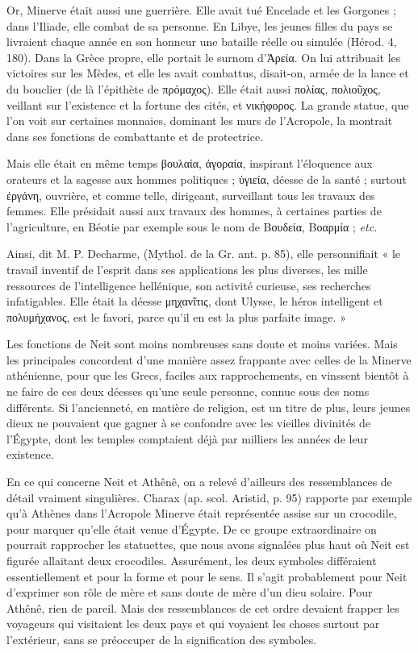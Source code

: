 \documentclass[a4paper, 11pt, oneside]{article}
\begin{document}
Or, Minerve était aussi une guerrière. Elle avait tué Encelade et les Gorgones ; dans l'Iliade, elle combat de sa personne. En Libye, les jeunes filles du pays se livraient chaque année en son honneur une bataille réelle ou simulée (Hérod. 4, 180). Dans la Grèce propre, elle portait le surnom d'Ἀρεία. On lui attribuait les victoires sur les Mèdes, et elle les avait combattus, disait-on, armée de la lance et du bouclier (de là l'épithète de πρόμαχος). Elle était aussi πολίας, πολιοῦχος, veillant sur l'existence et la fortune des cités, et νικήφορος. La grande statue, que l'on voit sur certaines monnaies, dominant les murs de l'Acropole, la montrait dans ses fonctions de combattante et de protectrice.

Mais elle était en même temps βουλαία, ἀγοραία, inspirant l'éloquence aux orateurs et la sagesse aux hommes politiques ; ὑγιεία, déesse de la santé ; surtout ἐργάνη, ouvrière, et comme telle, dirigeant, surveillant tous les travaux des femmes. Elle présidait aussi aux travaux des hommes, à certaines parties de l'agriculture, en Béotie par exemple sous le nom de Βουδεία, Βοαρμία ; \emph{etc.}

Ainsi, dit M. P. Decharme, (Mythol. de la Gr. ant. p. 85), elle personnifiait « le travail inventif de l'esprit dans ses applications les plus diverses, les mille ressources de l'intelligence hellénique, son activité curieuse, ses recherches infatigables. Elle était la déesse μηχανῖτις, dont Ulysse, le héros intelligent et πολυμήχανος, est le favori, parce qu’il en est la plus parfaite image. »

Les fonctions de Neit sont moins nombreuses sans doute et moins variées. Mais les principales concordent d'une manière assez frappante avec celles de la Minerve athénienne, pour que les Grecs, faciles aux rapprochements, en vinssent bientôt à ne faire de ces deux déesses qu'une seule personne, connue sous des noms différents. Si l'ancienneté, en matière de religion, est un titre de plus, leurs jeunes dieux ne pouvaient que gagner à se confondre avec les vieilles divinités de l'Égypte, dont les temples comptaient déjà par milliers les années de leur existence.

En ce qui concerne Neit et Athênê, on a relevé d'ailleurs des ressemblances de détail vraiment singulières. Charax (ap. scol. Aristid, p. 95) rapporte par exemple qu'à Athènes dans l'Acropole Minerve était représentée assise sur un crocodile, pour marquer qu'elle était venue d'Égypte. De ce groupe extraordinaire on pourrait rapprocher les statuettes, que nous avons signalées plus haut où Neit est figurée allaitant deux crocodiles. Assurément, les deux symboles différaient essentiellement et pour la forme et pour le sens. Il s'agit probablement pour Neit d'exprimer son rôle de mère et sans doute de mère d'un dieu solaire. Pour Athênê, rien de pareil. Mais des ressemblances de cet ordre devaient frapper les voyageurs qui visitaient les deux pays et qui voyaient les choses surtout par l'extérieur, sans se préoccuper de la signification des symboles.
\end{document}
